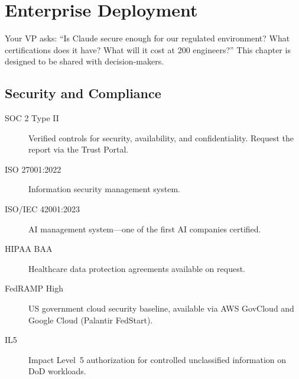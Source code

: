 \chapter{Enterprise Deployment}
\label{ch:enterprise}

\begin{itshape}
Your VP asks: ``Is Claude secure enough for our regulated environment?
What certifications does it have? What will it cost at 200 engineers?''
This chapter is designed to be shared with decision-makers.
\end{itshape}

\section{Security and Compliance}
\label{sec:security}



\begin{description}
  \item[SOC 2 Type II] Verified controls for security, availability, and confidentiality.
    Request the report via the Trust Portal.
  \item[ISO 27001:2022] Information security management system.
  \item[ISO/IEC 42001:2023] AI management system---one of the first AI companies certified.
  \item[HIPAA BAA] Healthcare data protection agreements available on request.
\end{description}


\begin{description}
  \item[FedRAMP High] US government cloud security baseline, available via
    AWS GovCloud and Google Cloud (Palantir FedStart).
  \item[IL5] Impact Level~5 authorization for controlled unclassified information
    on DoD workloads.
\end{description}

